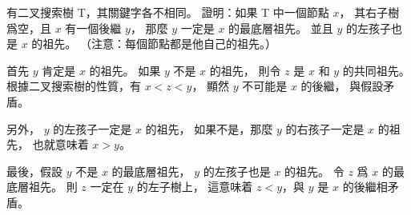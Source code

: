 \startEXERCISE
有二叉搜索樹 T，其關鍵字各不相同。
證明：如果 T 中一個節點 $x$，
其右子樹爲空，且 $x$ 有一個後繼 $y$，
那麼 $y$ 一定是 $x$ 的最底層祖先。
並且 $y$ 的左孩子也是 $x$ 的祖先。
（注意：每個節點都是他自己的祖先。）
\stopEXERCISE

\startANSWER
首先 $y$ 肯定是 $x$ 的祖先。
如果 $y$ 不是 $x$ 的祖先，
則令 $z$ 是 $x$ 和 $y$ 的共同祖先。
根據二叉搜索樹的性質，有 $x<z<y$，
顯然 $y$ 不可能是 $x$ 的後繼，
與假設矛盾。

另外， $y$ 的左孩子一定是 $x$ 的祖先，
如果不是，那麼 $y$ 的右孩子一定是 $x$ 的祖先，
也就意味着 $x>y$。

最後，假設 $y$ 不是 $x$ 的最底層祖先，
 $y$ 的左孩子也是 $x$ 的祖先。
令 $z$ 爲 $x$ 的最底層祖先。
則 $z$ 一定在 $y$ 的左子樹上，
這意味着 $z<y$，與 $y$ 是 $x$ 的後繼相矛盾。
\stopANSWER
